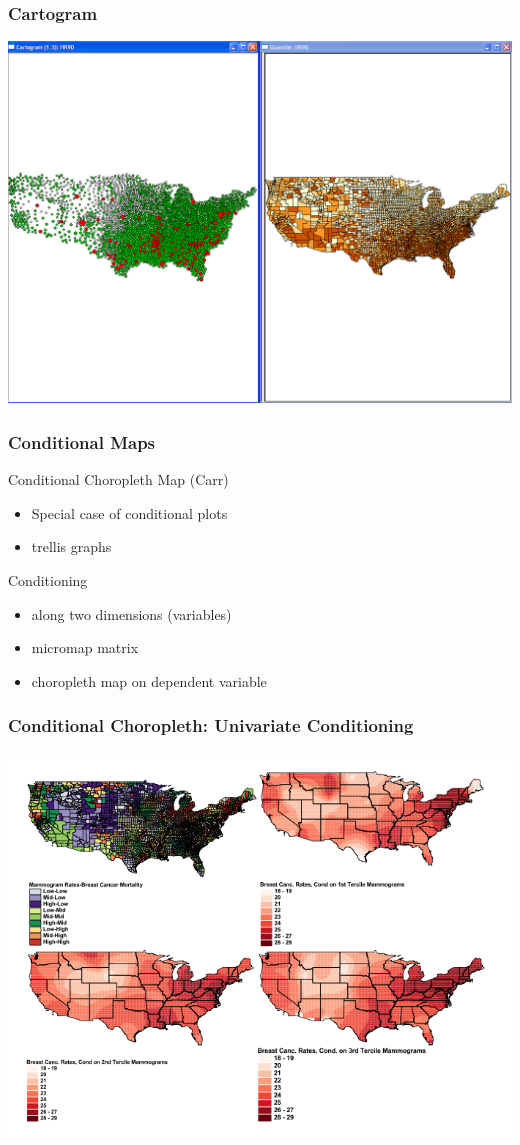 \documentclass[nototal]{beamer}
\begin{document}
\begin{frame}
	\frametitle{Cartogram}
 \begin{center}
 \includegraphics[width=.85\linewidth]{cartogram.png}
  \end{center}
 \end{frame} 

\begin{frame}
	\frametitle{Conditional Maps}
 
\begin{block}{Conditional Choropleth Map (Carr)}
 \begin{itemize}
 \item  Special case of conditional plots
 \item  trellis graphs	
 \end{itemize}
 \end{block} 
\begin{block}{Conditioning}
 \begin{itemize}
 \item  along two dimensions (variables)
 \item  micromap matrix
 \item  choropleth map on dependent variable
 \end{itemize}
 \end{block} \end{frame} 

\begin{frame}
	\frametitle{Conditional Choropleth: Univariate Conditioning}
 \begin{center}
 \includegraphics[width=.85\linewidth]{conditionalchoropleth.png}
  \end{center}
 \end{frame} 
\end{document}
